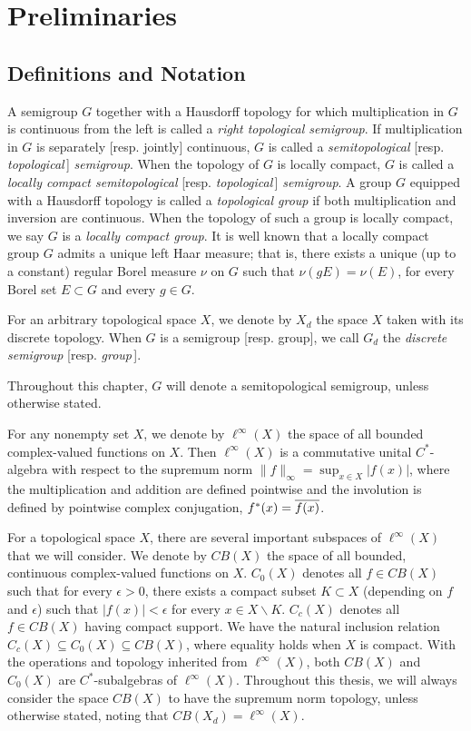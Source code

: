 \chapter{Preliminaries}

\section{Definitions and Notation}

A semigroup $G$ together with a Hausdorff topology for which
multiplication in $G$ is continuous from the left is called a 
{\it right topological semigroup}.
If multiplication in $G$ is separately [resp. jointly] continuous, $G$ is called a
{\it semitopological} [resp. {\it topological}\,] {\it semigroup}.
When
the topology of $G$ is locally compact, $G$ is called a {\it locally compact semitopological}
[resp. {\it topological}\,] {\it semigroup}.
A group $G$ equipped with a Hausdorff topology is called a {\it topological group}
if both multiplication and inversion are continuous.  When the topology of such a group is
locally compact, we say $G$ is a {\it locally compact group}.  It is well known
that a locally compact group $G$ admits a unique left Haar measure; that is, there
exists a unique (up to a constant) regular Borel measure $\nu$ on $G$ such that
$\nu(gE) = \nu(E)$, for every Borel set $E\subset G$ and every $g\in G$.

For an arbitrary topological space $X$, we denote by $X_d$ the space $X$ taken with its discrete topology.
When $G$ is a semigroup [resp. group], we call $G_d$ the {\it discrete semigroup} [resp. {\it group}\,].

Throughout this chapter, $G$ will denote a semitopological semigroup,
unless otherwise stated.

For any nonempty set $X$,
we denote by $\ell^\infty(X)$ the space of all bounded complex-valued functions on $X$.
Then $\ell^\infty(X)$ is a commutative unital $C^*$-algebra with respect to the supremum norm
$\|f\|_\infty = \sup_{x\in X} |f(x)|$, where the multiplication and addition are defined pointwise
and the involution is defined by pointwise complex conjugation, $f^*(x) = \overline{f(x)}$.

For a topological space $X$, there are several important subspaces of $\ell^\infty(X)$ that we will consider.
We denote by $CB(X)$ the space of all bounded, continuous complex-valued functions on $X$.
$C_0 (X)$ denotes all $f\in CB(X)$ such that for every $\epsilon >0$, there exists a compact
subset $K\subset X$ (depending on $f$ and $\epsilon$) such that $|f(x)| < \epsilon$ for every
$x\in X\backslash K$.
$C_c (X)$ denotes all $f\in CB(X)$ having compact support.  We have the natural inclusion relation
$C_c(X) \subseteq C_0(X) \subseteq CB(X)$, where equality holds when $X$ is compact.
With the operations and topology inherited from $\ell^\infty(X)$, both $CB(X)$ and $C_0(X)$ are $C^*$-subalgebras
of $\ell^\infty(X)$.  Throughout this thesis, we will always consider the space $CB(X)$ to have the
supremum norm topology, unless otherwise stated, noting that $CB(X_d) = \ell^\infty(X)$.


